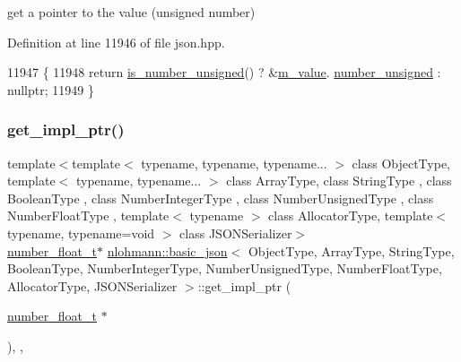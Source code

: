 get a pointer to the value (unsigned number) 



Definition at line 11946 of file json.\+hpp.


\begin{DoxyCode}
11947     \{
11948         \textcolor{keywordflow}{return} \hyperlink{classnlohmann_1_1basic__json_abc7378cba0613a78b9aad1c8e7044bb0}{is\_number\_unsigned}() ? &\hyperlink{classnlohmann_1_1basic__json_aeb0814f76966f99290cb29e127c90a77}{m\_value}.
      \hyperlink{unionnlohmann_1_1basic__json_1_1json__value_a0299a6aa3bc4d45d54130e52970f73d3}{number\_unsigned} : \textcolor{keyword}{nullptr};
11949     \}
\end{DoxyCode}
\mbox{\label{classnlohmann_1_1basic__json_a01e81365c2c6897b39b793530e02aca5}} 
\subsubsection{\texorpdfstring{get\+\_\+impl\+\_\+ptr()}{get\_impl\_ptr()}\hspace{0.1cm}{\footnotesize\ttfamily [13/14]}}
{\footnotesize\ttfamily template$<$template$<$ typename, typename, typename... $>$ class Object\+Type, template$<$ typename, typename... $>$ class Array\+Type, class String\+Type , class Boolean\+Type , class Number\+Integer\+Type , class Number\+Unsigned\+Type , class Number\+Float\+Type , template$<$ typename $>$ class Allocator\+Type, template$<$ typename, typename=void $>$ class J\+S\+O\+N\+Serializer$>$ \\
\hyperlink{classnlohmann_1_1basic__json_a88d6103cb3620410b35200ee8e313d97}{number\+\_\+float\+\_\+t}$\ast$ \hyperlink{classnlohmann_1_1basic__json}{nlohmann\+::basic\+\_\+json}$<$ Object\+Type, Array\+Type, String\+Type, Boolean\+Type, Number\+Integer\+Type, Number\+Unsigned\+Type, Number\+Float\+Type, Allocator\+Type, J\+S\+O\+N\+Serializer $>$\+::get\+\_\+impl\+\_\+ptr (\begin{DoxyParamCaption}\item[{\hyperlink{classnlohmann_1_1basic__json_a88d6103cb3620410b35200ee8e313d97}{number\+\_\+float\+\_\+t} $\ast$}]{ }\end{DoxyParamCaption})\hspace{0.3cm}{\ttfamily [inline]}, {\ttfamily [private]}, {\ttfamily [noexcept]}}



